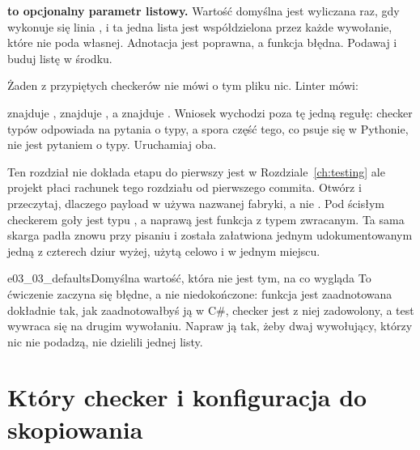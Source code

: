 

\begin{trapbox}
\textbf{ to opcjonalny parametr listowy.}
Wartość domyślna jest wyliczana raz, gdy wykonuje się linia , i ta
jedna lista jest współdzielona przez każde wywołanie, które nie poda
własnej. Adnotacja jest poprawna, a funkcja błędna. Podawaj  i
buduj listę w środku.
\end{trapbox}

\noindent
Żaden z przypiętych checkerów nie mówi o tym pliku nic. Linter mówi:


\noindent
{} znajduje ,  znajduje
, a  znajduje .
Wniosek wychodzi poza tę jedną regułę: checker typów odpowiada na pytania o
typy, a spora część tego, co psuje się w Pythonie, nie jest pytaniem o typy.
Uruchamiaj oba.

\begin{projectbox}
Ten rozdział nie dokłada etapu do  \dash{} pierwszy jest
w Rozdziale~\ref{ch:testing} \dash{} ale projekt płaci rachunek tego
rozdziału od pierwszego commita. Otwórz
 i przeczytaj, dlaczego payload
w  używa nazwanej fabryki, a nie . Pod
ścisłym checkerem goły  jest typu , a
naprawą jest funkcja z typem zwracanym. Ta sama skarga padła znowu przy
pisaniu  i została załatwiona jednym
udokumentowanym  \dash{} jedną z czterech dziur wyżej, użytą
celowo i w jednym miejscu.
\end{projectbox}

\begin{exercise}{e03_03_defaults}{Domyślna wartość, która nie jest tym, na co wygląda}
To ćwiczenie zaczyna się błędne, a nie niedokończone: funkcja jest
zaadnotowana dokładnie tak, jak zaadnotowałbyś ją w C\#, checker jest z niej
zadowolony, a test wywraca się na drugim wywołaniu. Napraw ją tak, żeby dwaj
wywołujący, którzy nic nie podadzą, nie dzielili jednej listy.
\end{exercise}

\section{Który checker i konfiguracja do skopiowania}
\label{sec:ch03-config}

